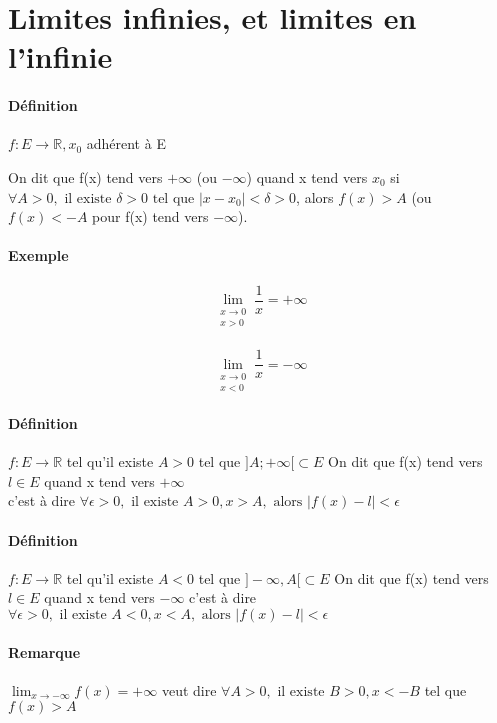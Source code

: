 \section{Limites infinies, et limites en l'infinie}
\paragraph{Définition} $f:E\rightarrow \mathbb{R}, x_0$ adhérent à E

On dit que f(x) tend vers $+\infty$ (ou $-\infty$) quand x tend vers $x_0$ si $\forall A > 0, \text{ il existe } \delta > 0 \text{ tel que } |x - x_0| < \delta > 0$, alors $f(x) > A$ (ou $f(x) < -A$ pour f(x) tend vers $-\infty$).

\paragraph{Exemple} \[\lim_{\substack{x \to 0 \\ x > 0}} \frac{1}{x} = +\infty\]
~\\

\[\lim_{\substack{x \to 0 \\ x < 0}} \frac{1}{x} = -\infty\]

\paragraph{Définition} $f:E \rightarrow \mathbb{R}$ tel qu'il existe $A >0$ tel que $]A; +\infty[ \subset E$
	On dit que f(x) tend vers $l \in E$ quand x tend vers $+\infty$ 
	~\\
	c'est à dire $\forall \epsilon > 0, \text{ il existe } A >0, x > A, \text{ alors } |f(x) - l| < \epsilon$

\paragraph{Définition} $f:E \rightarrow \mathbb{R}$ tel qu'il existe $A <0$ tel que $]-\infty, A[ \subset E$
	On dit que f(x) tend vers $l \in E$ quand x tend vers $-\infty$ 
	c'est à dire $\forall \epsilon > 0, \text{ il existe } A <0, x < A, \text{ alors } |f(x) - l| < \epsilon$

	\paragraph{Remarque} $\lim_{x \to -\infty} f(x) = +\infty$ veut dire 
	$\forall A >0, \text{ il existe } B > 0, x < -B$ tel que $f(x) > A$

